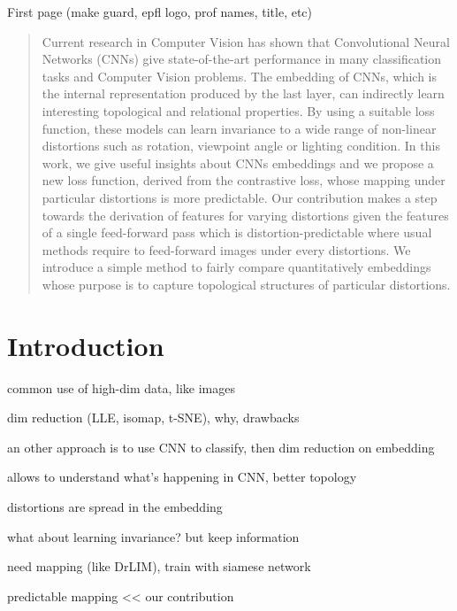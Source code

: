 \documentclass[a4paper,12pt]{report}
\begin{document}
\thispagestyle{empty}
First page (make guard, epfl logo, prof names, title, etc)

\newpage
\begin{abstract}
    Current research in Computer Vision has shown that Convolutional Neural Networks (CNNs) give state-of-the-art performance in many classification tasks and Computer Vision problems.
    The embedding of CNNs, which is the internal representation produced by the last layer, can indirectly learn interesting topological and relational properties.
    By using a suitable loss function, these models can learn invariance to a wide range of non-linear distortions such as rotation, viewpoint angle or lighting condition.
    In this work, we give useful insights about CNNs embeddings and we propose a new loss function, derived from the contrastive loss, whose mapping under particular distortions is more predictable.
    Our contribution makes a step towards the derivation of features for varying distortions given the features of a single feed-forward pass which is distortion-predictable where usual methods require to feed-forward images under every distortions.
    We introduce a simple method to fairly compare quantitatively embeddings whose purpose is to capture topological structures of particular distortions.
\end{abstract}

\tableofcontents


\chapter{Introduction}
common use of high-dim data, like images

dim reduction (LLE, isomap, t-SNE), why, drawbacks

an other approach is to use CNN to classify, then dim reduction on embedding

allows to understand what's happening in CNN, better topology

distortions are spread in the embedding

what about learning invariance? but keep information

need mapping (like DrLIM), train with siamese network

predictable mapping << our contribution
\end{document}

